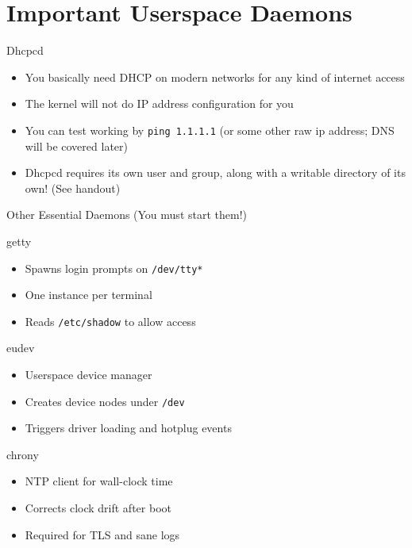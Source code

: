 \documentclass{../lecture}
\begin{document}
\section{Important Userspace Daemons}

\begin{frame}{Dhcpcd}
  \begin{itemize}
    \item You basically need DHCP on modern networks for any kind of internet
      access
    \item The kernel will not do IP address configuration for you
    \item You can test working by \texttt{ping 1.1.1.1} (or some other raw ip
      address; DNS will be covered later)
    \item Dhcpcd requires its own user and group, along with a writable
      directory of its own! (See handout)
  \end{itemize}
\end{frame}

\begin{frame}{Other Essential Daemons (You must start them!)}
  \begin{block}{getty}
    \begin{itemize}
      \item Spawns login prompts on \texttt{/dev/tty*}
      \item One instance per terminal
      \item Reads \texttt{/etc/shadow} to allow access
    \end{itemize}
  \end{block}
  \begin{block}{eudev}
    \begin{itemize}
      \item Userspace device manager
      \item Creates device nodes under \texttt{/dev}
      \item Triggers driver loading and hotplug events
    \end{itemize}
  \end{block}
  \begin{block}{chrony}
    \begin{itemize}
      \item NTP client for wall-clock time
      \item Corrects clock drift after boot
      \item Required for TLS and sane logs
    \end{itemize}
  \end{block}
\end{frame}
\end{document}
